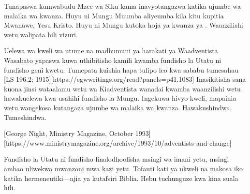 Tunapaswa kumwabudu Mzee wa Siku kama inavyotangazwa katika ujumbe wa malaika wa kwanza. Huyu ni Mungu Muumba aliyeumba kila kitu kupitia Mwanawe, Yesu Kristo. Huyu ni Mungu kutoka hoja ya kwanza ya . Waanzilishi wetu walipata hili vizuri.


Uelewa wa kweli wa utume na madhumuni ya harakati ya Waadventista Wasabato yapaswa kuwa uthibitisho kamili kwamba fundisho la Utatu ni fundisho geni kwetu. Tumepata kuishia hapa tulipo leo kwa sababu tumesahau [LS 196.2; 1915][https://egwwritings.org/read?panels=p41.1083] Inasikitisha sana kuona jinsi wataalamu wetu wa Kiadventista wanadai kwamba waanzilishi wetu hawakuelewa kwa usahihi fundisho la Mungu. Ingekuwa hivyo kweli, mapainia wetu wangekosa kutangaza ujumbe wa malaika wa kwanza. Hawakushindwa. Tumeshindwa.


[George Night, Ministry Magazine, October 1993][https://www.ministrymagazine.org/archive/1993/10/adventists-and-change]


Fundisho la Utatu ni fundisho linalodhoofisha msingi wa imani yetu, msingi ambao uliwekwa mwanzoni mwa kazi yetu. Tofauti kati ya ukweli na makosa iko katika hermeneutiki—njia ya kutafsiri Biblia. Hebu tuchunguze kwa kina suala hili.




